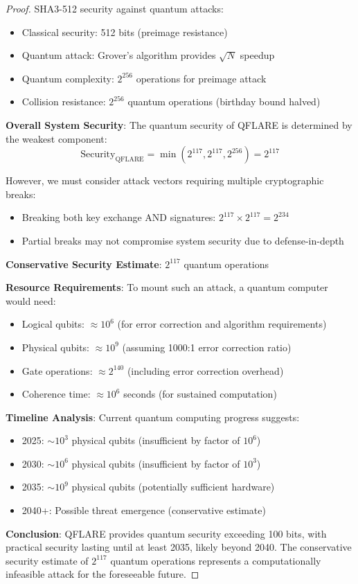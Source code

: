 \documentclass[11pt]{article}
\begin{document}
\begin{proof}
SHA3-512 security against quantum attacks:
\begin{itemize}
\item Classical security: 512 bits (preimage resistance)
\item Quantum attack: Grover's algorithm provides $\sqrt{N}$ speedup
\item Quantum complexity: $2^{256}$ operations for preimage attack
\item Collision resistance: $2^{256}$ quantum operations (birthday bound halved)
\end{itemize}

\textbf{Overall System Security}:
The quantum security of QFLARE is determined by the weakest component:
$$\text{Security}_{\text{QFLARE}} = \min(2^{117}, 2^{117}, 2^{256}) = 2^{117}$$

However, we must consider attack vectors requiring multiple cryptographic breaks:
\begin{itemize}
\item Breaking both key exchange AND signatures: $2^{117} \times 2^{117} = 2^{234}$
\item Partial breaks may not compromise system security due to defense-in-depth
\end{itemize}

\textbf{Conservative Security Estimate}: $2^{117}$ quantum operations

\textbf{Resource Requirements}:
To mount such an attack, a quantum computer would need:
\begin{itemize}
\item Logical qubits: $\approx 10^6$ (for error correction and algorithm requirements)
\item Physical qubits: $\approx 10^9$ (assuming 1000:1 error correction ratio)
\item Gate operations: $\approx 2^{140}$ (including error correction overhead)
\item Coherence time: $\approx 10^6$ seconds (for sustained computation)
\end{itemize}

\textbf{Timeline Analysis}:
Current quantum computing progress suggests:
\begin{itemize}
\item 2025: $\sim 10^3$ physical qubits (insufficient by factor of $10^6$)
\item 2030: $\sim 10^6$ physical qubits (insufficient by factor of $10^3$)  
\item 2035: $\sim 10^9$ physical qubits (potentially sufficient hardware)
\item 2040+: Possible threat emergence (conservative estimate)
\end{itemize}

\textbf{Conclusion}: QFLARE provides quantum security exceeding 100 bits, 
with practical security lasting until at least 2035, likely beyond 2040.
The conservative security estimate of $2^{117}$ quantum operations represents
a computationally infeasible attack for the foreseeable future.
\end{proof}
\end{document}
